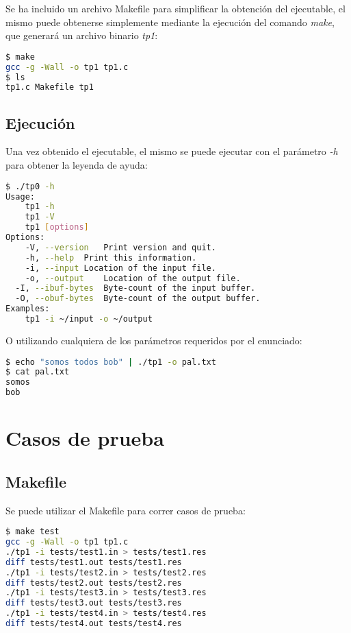 \documentclass[10pt,a4paper]{article}
\begin{document}
\lstset{
	breaklines=true,
  	basicstyle=\footnotesize,
}

Se ha incluido un archivo Makefile para simplificar la obtención del ejecutable, el mismo puede obtenerse simplemente mediante la ejecución del comando \textit{make}, que generará un archivo binario \textit{tp1}:

\begin{lstlisting}[language=bash]
$ make
gcc -g -Wall -o tp1 tp1.c 
$ ls
tp1.c Makefile tp1 
\end{lstlisting}

\subsection{Ejecución}

Una vez obtenido el ejecutable, el mismo se puede ejecutar con el parámetro \textit{-h} para obtener la leyenda de ayuda:

\begin{lstlisting}[language=bash]
$ ./tp0 -h
Usage:
	tp1 -h
	tp1 -V
	tp1 [options]
Options:
	-V, --version	Print version and quit.
	-h, --help	Print this information.
	-i, --input	Location of the input file.
	-o, --output	Location of the output file.
  -I, --ibuf-bytes  Byte-count of the input buffer.
  -O, --obuf-bytes  Byte-count of the output buffer.
Examples:
	tp1 -i ~/input -o ~/output

\end{lstlisting}

O utilizando cualquiera de los parámetros requeridos por el enunciado:

\begin{lstlisting}[language=bash]
$ echo "somos todos bob" | ./tp1 -o pal.txt
$ cat pal.txt
somos
bob
\end{lstlisting}

\newpage

\section{Casos de prueba}

\subsection{Makefile}

Se puede utilizar el Makefile para correr casos de prueba:

\begin{lstlisting}[language=bash]
$ make test
gcc -g -Wall -o tp1 tp1.c 
./tp1 -i tests/test1.in > tests/test1.res
diff tests/test1.out tests/test1.res
./tp1 -i tests/test2.in > tests/test2.res
diff tests/test2.out tests/test2.res
./tp1 -i tests/test3.in > tests/test3.res
diff tests/test3.out tests/test3.res
./tp1 -i tests/test4.in > tests/test4.res
diff tests/test4.out tests/test4.res
\end{lstlisting}
\end{document}
